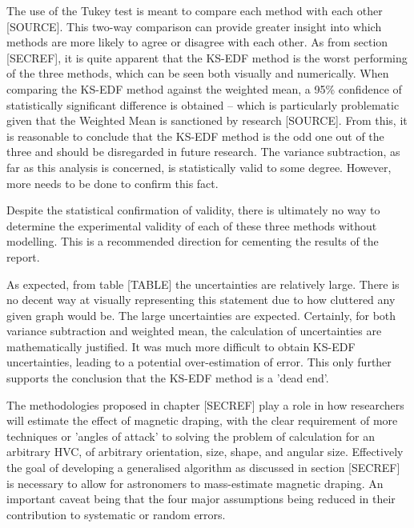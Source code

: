 The use of the Tukey test is meant to compare each method with each other [SOURCE]. This two-way comparison can provide greater insight into which methods are more likely to agree or disagree with each other. As from section [SECREF], it is quite apparent that the KS-EDF method is the worst performing of the three methods, which can be seen both visually and numerically. When comparing the KS-EDF method against the weighted mean, a 95\% confidence of statistically significant difference is obtained – which is particularly problematic given that the Weighted Mean is sanctioned by research [SOURCE]. From this, it is reasonable to conclude that the KS-EDF method is the odd one out of the three and should be disregarded in future research. The variance subtraction, as far as this analysis is concerned, is statistically valid to some degree. However, more needs to be done to confirm this fact.


Despite the statistical confirmation of validity, there is ultimately no way to determine the experimental validity of each of these three methods without modelling. This is a recommended direction for cementing the results of the report.


As expected, from table [TABLE] the uncertainties are relatively large. There is no decent way at visually representing this statement due to how cluttered any given graph would be. The large uncertainties are expected. Certainly, for both variance subtraction and weighted mean, the calculation of uncertainties are mathematically justified. It was much more difficult to obtain KS-EDF uncertainties, leading to a potential over-estimation of error. This only further supports the conclusion that the KS-EDF method is a 'dead end'.

The methodologies proposed in chapter [SECREF] play a role in how researchers will estimate the effect of magnetic draping, with the clear requirement of more techniques or 'angles of attack' to solving the problem of calculation for an arbitrary HVC, of arbitrary orientation, size, shape, and angular size. Effectively the goal of developing a generalised algorithm as discussed in section [SECREF] is necessary to allow for astronomers to mass-estimate magnetic draping. An important caveat being that the four major assumptions being reduced in their contribution to systematic or random errors.

